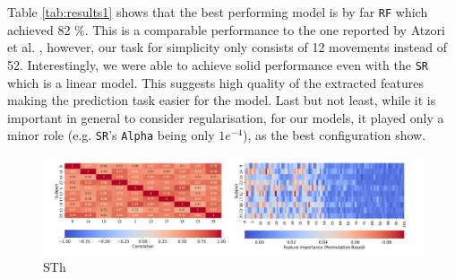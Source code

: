 \documentclass[10pt]{article}
\begin{document}
Table \ref{tab:results1} shows that the best performing model is by far \texttt{RF} which achieved 82 \%.
This is a comparable performance to the one reported by Atzori et al. \cite{ninapro},
however, our task for simplicity only consists of 12 movements instead of 52. Interestingly,
we were able to achieve solid performance even with the \texttt{SR} which is a linear model.
This suggests high quality of the extracted features making the prediction task easier for the model.
Last but not least, while it is important in general to consider 
regularisation, for our models, it played only a minor role (e.g. \texttt{SR}'s \texttt{Alpha} being only $1e^{-4}$), as the best configuration show.


\begin{figure}[h]
    \centering
    \includegraphics[width=1\textwidth]{../figures/fig_feat_imp.pdf}
    \caption{STh}
    \label{fig:feat_imp}
\end{figure}


\newpage


\end{document}
